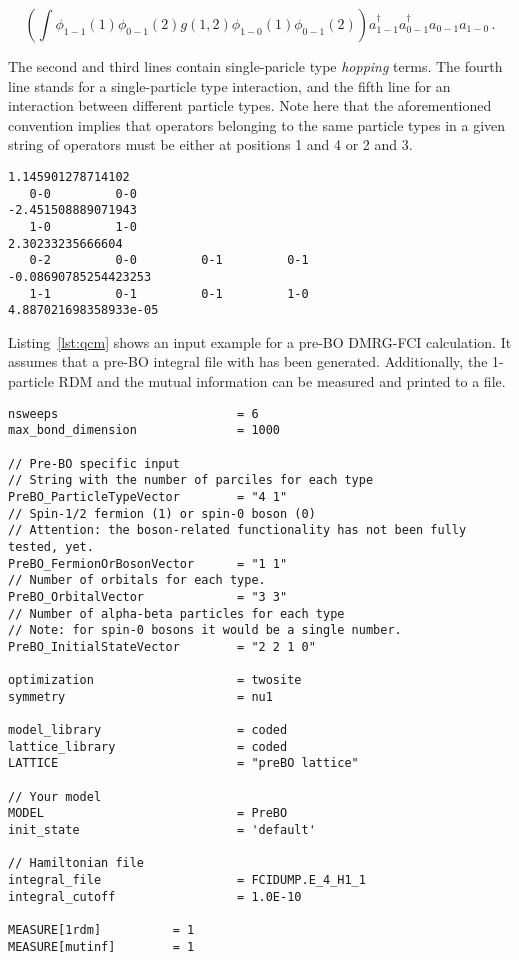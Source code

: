 \documentclass[bibliography=totoc,12pt,a4paper]{scrartcl}
\begin{document}
\begin{equation}
  \left(\int \phi_{1-1}(1)\phi_{0-1}(2)g(1,2)\phi_{1-0}(1)\phi_{0-1}(2)\right)
  a^\dagger_{1-1} a^\dagger_{0-1} a_{0-1} a_{1-0}\,.
\end{equation}

The second and third lines contain single-paricle type \textit{hopping} terms.
The fourth line stands for a single-particle type interaction, and the fifth
line for an interaction between different particle types. 
Note here that the aforementioned convention implies that operators belonging to
the same particle types in a given string of operators must be either at
positions 1 and 4 or 2 and 3. 

\begin{lstlisting}[language=qcmaquis,caption={Pre-BO integral file
format.},label=lst:prebodump]
1.145901278714102                       
   0-0         0-0                                      -2.451508889071943
   1-0         1-0                                      2.30233235666604
   0-2         0-0         0-1         0-1              -0.08690785254423253
   1-1         0-1         0-1         1-0              4.887021698358933e-05
\end{lstlisting}

Listing~\ref{lst:qcm} shows an input example for a pre-BO DMRG-FCI calculation. 
It assumes that a pre-BO integral file with has been generated. Additionally,
the 1-particle RDM and the mutual information can be measured and printed to a
file.

\begin{lstlisting}[language=qcmaquis,caption={Input example for a pre-BO DMRG-FCI
calculation},label=lst:preboinput]
nsweeps                         = 6
max_bond_dimension              = 1000

// Pre-BO specific input
// String with the number of parciles for each type
PreBO_ParticleTypeVector        = "4 1"
// Spin-1/2 fermion (1) or spin-0 boson (0)
// Attention: the boson-related functionality has not been fully tested, yet.
PreBO_FermionOrBosonVector      = "1 1"
// Number of orbitals for each type.
PreBO_OrbitalVector             = "3 3"
// Number of alpha-beta particles for each type
// Note: for spin-0 bosons it would be a single number.
PreBO_InitialStateVector        = "2 2 1 0"

optimization                    = twosite 
symmetry                        = nu1

model_library                   = coded
lattice_library                 = coded
LATTICE                         = "preBO lattice" 

// Your model
MODEL                           = PreBO
init_state                      = 'default'

// Hamiltonian file
integral_file                   = FCIDUMP.E_4_H1_1
integral_cutoff                 = 1.0E-10

MEASURE[1rdm]          = 1
MEASURE[mutinf]        = 1
\end{lstlisting}
\end{document}
